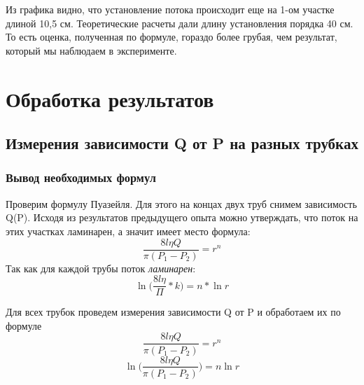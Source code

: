 \documentclass[a4paper,12pt]{article}
\theoremstyle{plain} %
\theoremstyle{definition} %
\theoremstyle{remark} %
\begin{document}
\indent Из графика видно, что установление потока происходит еще на 1-ом участке длиной 10,5 см. Теоретические расчеты дали длину установления порядка 40 см. То есть оценка, полученная по формуле, гораздо более грубая, чем результат, который мы наблюдаем в эксперименте.

\newpage
\section{Обработка результатов}

\subsection{Измерения зависимости Q от P на разных трубках}

\subsubsection{Вывод необходимых формул}
\indent Проверим формулу Пуазейля. Для этого на концах двух труб снимем зависимость Q(P). Исходя из результатов предыдущего опыта можно утверждать, что поток на этих участках ламинарен, а значит имеет место формула: 
$$\frac{8l\eta Q}{\pi(P_1-P_2)}=r^n$$
Так как для каждой трубы поток \textit{ламинарен}:
\[\ln\Big(\dfrac {8l\eta}{\Pi}*k \Big) = n* \ln r \]


\indent Для всех трубок проведем измерения зависимости Q от P и обработаем их по формуле 
$$\frac{8l\eta Q}{\pi(P_1-P_2)}=r^n$$
$$\ln \Big(\frac{8l\eta Q}{\pi(P_1-P_2)} \Big) = n\ln r$$
\end{document}
